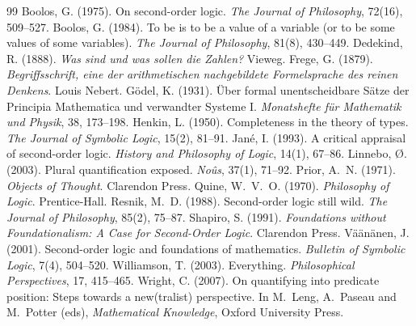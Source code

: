\documentclass{situationist-preprint}
\begin{document}
\begin{thebibliography}{99}\small
{} Boolos, G. (1975). On second-order logic. \emph{The Journal of Philosophy}, 72(16), 509--527.
 Boolos, G. (1984). To be is to be a value of a variable (or to be some values of some variables). \emph{The Journal of Philosophy}, 81(8), 430--449.
 Dedekind, R. (1888). \emph{Was sind und was sollen die Zahlen?} Vieweg.
 Frege, G. (1879). \emph{Begriffsschrift, eine der arithmetischen nachgebildete Formelsprache des reinen Denkens}. Louis Nebert.
 G\"odel, K. (1931). \"Uber formal unentscheidbare S\"atze der Principia Mathematica und verwandter Systeme I. \emph{Monatshefte f\"ur Mathematik und Physik}, 38, 173--198.
 Henkin, L. (1950). Completeness in the theory of types. \emph{The Journal of Symbolic Logic}, 15(2), 81--91.
 Jan\'e, I. (1993). A critical appraisal of second-order logic. \emph{History and Philosophy of Logic}, 14(1), 67--86.
 Linnebo, {\O}. (2003). Plural quantification exposed. \emph{No\^us}, 37(1), 71--92.
 Prior, A.~N. (1971). \emph{Objects of Thought}. Clarendon Press.
 Quine, W.~V.~O. (1970). \emph{Philosophy of Logic}. Prentice-Hall.
 Resnik, M.~D. (1988). Second-order logic still wild. \emph{The Journal of Philosophy}, 85(2), 75--87.
 Shapiro, S. (1991). \emph{Foundations without Foundationalism: A Case for Second-Order Logic}. Clarendon Press.
 V\"a\"an\"anen, J. (2001). Second-order logic and foundations of mathematics. \emph{Bulletin of Symbolic Logic}, 7(4), 504--520.
 Williamson, T. (2003). Everything. \emph{Philosophical Perspectives}, 17, 415--465.
 Wright, C. (2007). On quantifying into predicate position: Steps towards a new(tralist) perspective. In M.~Leng, A.~Paseau and M.~Potter (eds), \emph{Mathematical Knowledge}, Oxford University Press.
\end{thebibliography}
\end{document}
